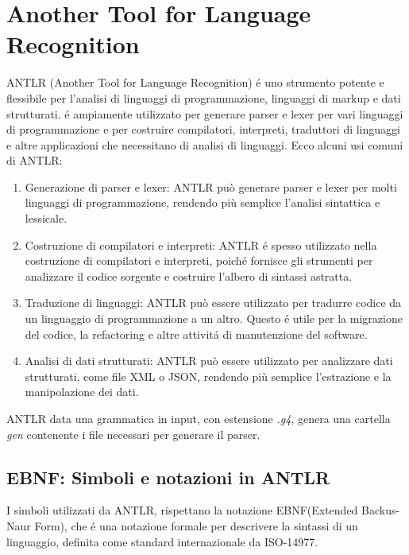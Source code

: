 \documentclass[../../main.tex]{subfiles}
\begin{document}
\section{Another Tool for Language Recognition}
ANTLR (Another Tool for Language Recognition) é uno strumento potente e flessibile per l'analisi di linguaggi di programmazione, linguaggi di markup e dati strutturati. é ampiamente utilizzato per generare parser e lexer per vari linguaggi di programmazione e per costruire compilatori, interpreti, traduttori di linguaggi e altre applicazioni che necessitano di analisi di linguaggi.
Ecco alcuni usi comuni di ANTLR:
\begin{enumerate}
    \item Generazione di parser e lexer: ANTLR può generare parser e lexer per molti linguaggi di programmazione, rendendo più semplice l'analisi sintattica e lessicale.
    \item Costruzione di compilatori e interpreti: ANTLR é spesso utilizzato nella costruzione di compilatori e interpreti, poiché fornisce gli strumenti per analizzare il codice sorgente e costruire l'albero di sintassi astratta.
    \item Traduzione di linguaggi: ANTLR può essere utilizzato per tradurre codice da un linguaggio di programmazione a un altro. Questo é utile per la migrazione del codice, la refactoring e altre attivitá di manutenzione del software.
    \item Analisi di dati strutturati: ANTLR può essere utilizzato per analizzare dati strutturati, come file XML o JSON, rendendo più semplice l'estrazione e la manipolazione dei dati.
\end{enumerate}

ANTLR data una grammatica in input, con estensione \textit{.g4}, genera una cartella \textit{gen} contenente i file necessari per generare il parser.\\

\subsection{EBNF: Simboli e notazioni in ANTLR}
I simboli utilizzati da ANTLR, rispettano la notazione EBNF(Extended Backus-Naur Form), che é una notazione formale per descrivere la sintassi di un linguaggio, definita come standard internazionale da ISO-14977.
\end{document}
